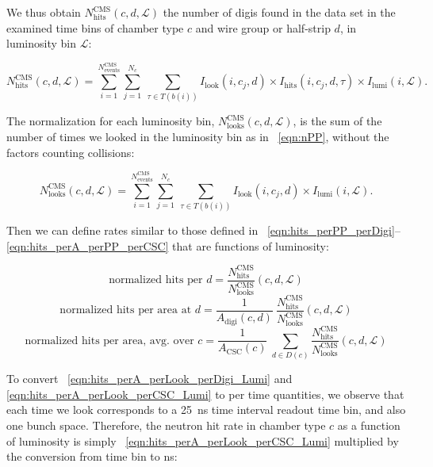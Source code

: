 We thus obtain $N_\text{hits}^\text{CMS}(c, d, \mathcal{L})$
the number of digis found in the data set in the examined time bins of
chamber type $c$ and wire group or half-strip $d$, in luminosity bin $\mathcal{L}$:

\begin{equation}
 	\label{eqn:nHits_Lumi}
        N_\text{hits}^\text{CMS}(c, d, \mathcal{L}) = 
        \sum_{i=1}^{N^\text{CMS}_\text{events}}
        \sum_{j=1}^{N_c} \ 
        \sum_{\tau\in T(b(i))}
        I_\text{look}(i, c_j, d) \times
        I_\text{hits}(i, c_j, d, \tau) \times
        I_\text{lumi}(i, \mathcal{L}). 
\end{equation}

The normalization for each luminosity bin, $N^\text{CMS}_\text{looks}(c,
d, \mathcal{L})$, is the sum of the number of times we looked in the
luminosity bin as in \Eq~\ref{eqn:nPP}, without the factors counting \pp
collisions:

\begin{equation}
 	\label{eqn:nLooks_Lumi}        
        N^\text{CMS}_\text{looks}(c, d, \mathcal{L}) = 
        \sum_{i=1}^{N^\text{CMS}_\text{events}}
        \sum_{j=1}^{N_c} \ 
        \sum_{\tau\in T(b(i))}
        I_\text{look}(i, c_j, d) \times
        I_\text{lumi}(i, \mathcal{L}).
\end{equation}

Then we can define rates similar to those defined in \Eqs~\ref{eqn:hits_perPP_perDigi}--\ref{eqn:hits_perA_perPP_perCSC} that are functions of luminosity:

\begin{equation}
	\label{eqn:hits_perLook_perDigi_Lumi}
\text{normalized hits per $d$} = 
   \frac{{N}^\text{CMS}_\text{hits}}{N^\text{CMS}_{\text{looks}}}(c, d, \mathcal{L})
\end{equation}
\begin{equation}
    \label{eqn:hits_perA_perLook_perDigi_Lumi}
\text{normalized hits per area at $d$} = 
  \frac{1}{A_\text{digi}(c, d)}  \  \frac{{N}^\text{CMS}_\text{hits}}{N^\text{CMS}_{\text{looks}}}(c, d, \mathcal{L})
\end{equation}
\begin{equation}
    \label{eqn:hits_perA_perLook_perCSC_Lumi}
\text{normalized hits per area, avg.\ over $c$} = 
  \frac{1}{A_\text{CSC}(c)}  \  \sum_{d\in D(c)}{\frac{{N}^\text{CMS}_\text{hits}}{N^\text{CMS}_{\text{looks}}}(c, d, \mathcal{L})}
\end{equation}

To convert \Eqs~\ref{eqn:hits_perA_perLook_perDigi_Lumi} and \ref{eqn:hits_perA_perLook_perCSC_Lumi} to per time quantities, we observe that each time we look corresponds to a 25~ns time interval readout time bin, and also one bunch space. Therefore, the neutron hit rate in chamber type $c$ as a function of luminosity is simply \Eq~\ref{eqn:hits_perA_perLook_perCSC_Lumi} multiplied by the conversion from time bin to ns:

